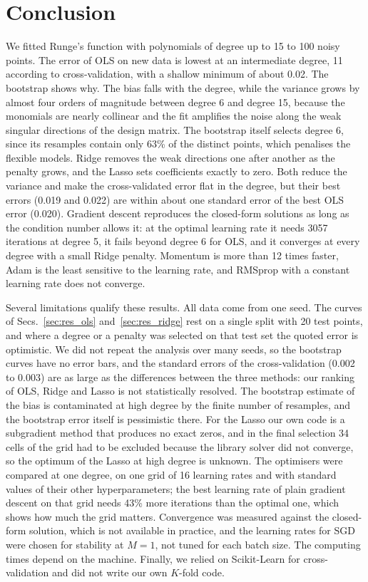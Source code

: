 \documentclass[aps,reprint,amsmath,amssymb,nofootinbib,floatfix]{revtex4-2}
\begin{document}
\section{Conclusion}\label{sec:conclusion}

We fitted Runge's function with polynomials of degree up to 15 to 100 noisy points. The error of
OLS on new data is lowest at an intermediate degree, 11 according to cross-validation, with a
shallow minimum of about 0.02. The bootstrap shows why. The bias falls with the degree, while the
variance grows by almost four orders of magnitude between degree 6 and degree 15, because the
monomials are nearly collinear and the fit amplifies the noise along the weak singular directions
of the design matrix. The bootstrap itself selects degree 6, since its resamples contain only 63\%
of the distinct points, which penalises the flexible models. Ridge removes the weak directions one
after another as the penalty grows, and the Lasso sets coefficients exactly to zero. Both reduce
the variance and make the cross-validated error flat in the degree, but their best errors (0.019
and 0.022) are within about one standard error of the best OLS error (0.020). Gradient descent
reproduces the closed-form solutions as long as the condition number allows it: at the optimal
learning rate it needs 3057 iterations at degree 5, it fails beyond degree 6 for OLS, and it
converges at every degree with a small Ridge penalty. Momentum is more than 12 times faster, Adam is
the least sensitive to the learning rate, and RMSprop with a constant learning rate does not converge.

Several limitations qualify these results. All data come from one seed. The curves of
Secs.~\ref{sec:res_ols} and~\ref{sec:res_ridge} rest on a single split with 20 test points, and
where a degree or a penalty was selected on that test set the quoted error is optimistic. We did
not repeat the analysis over many seeds, so the bootstrap curves have no error bars, and the
standard errors of the cross-validation (0.002 to 0.003) are as large as the differences between
the three methods: our ranking of OLS, Ridge and Lasso is not statistically resolved. The
bootstrap estimate of the bias is contaminated at high degree by the finite number of resamples,
and the bootstrap error itself is pessimistic there. For the Lasso our own code is a subgradient
method that produces no exact zeros, and in the final selection 34 cells of the grid had to be
excluded because the library solver did not converge, so the optimum of the Lasso at high degree
is unknown. The optimisers were compared at one degree, on one grid of 16 learning rates and with
standard values of their other hyperparameters; the best learning rate of plain gradient descent
on that grid needs 43\% more iterations than the optimal one, which shows how much the grid
matters. Convergence was measured against the closed-form solution, which is not available in
practice, and the learning rates for SGD were chosen for stability at $M=1$, not tuned for each
batch size. The computing times depend on the machine. Finally, we relied on Scikit-Learn for
cross-validation and did not write our own $K$-fold code.
\end{document}
